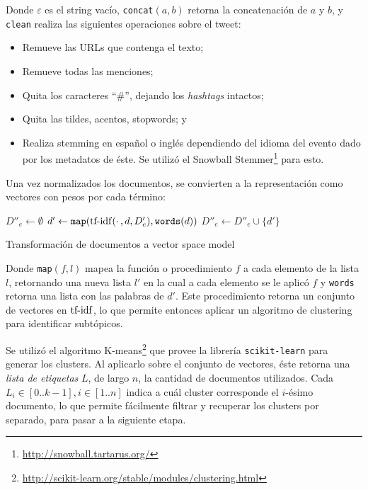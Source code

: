     Donde $\varepsilon$ es el string vacío, \texttt{concat}$(a,b)$ retorna
    la concatenación de $a$ y $b$, y \texttt{clean} realiza las siguientes
    operaciones sobre el tweet:

\begin{itemize}
\item Remueve las URLs que contenga el texto;
\item Remueve todas las menciones;
\item Quita los caracteres ``\#'', dejando los \emph{hashtags} intactos;
\item Quita las tildes, acentos, stopwords; y
\item Realiza stemming en español o inglés dependiendo del idioma del
      evento dado por los metadatos de éste. Se utilizó el Snowball
      Stemmer\footnote{\href{http://snowball.tartarus.org/}{http://snowball.tartarus.org/} } para esto.
\end{itemize}

    Una vez normalizados los documentos, se convierten a la
    representación como vectores con pesos por cada término:

\begin{algorithm}[H]
$D''_e \leftarrow \emptyset$ \;
 {
   $d' \leftarrow \texttt{map}(\operatorname{tf-idf}(\cdotp, d, D'_e), \texttt{words}(d))$\;
}
$D''_e \leftarrow D''_e \cup \{d'\}$\;
\caption{Transformación de documentos a vector space model}
\end{algorithm}

    Donde \texttt{map}$(f,l)$ mapea la
    función o procedimiento $f$ a cada elemento de la lista $l$,
    retornando una nueva lista $l'$ en la cual a cada elemento se le
    aplicó $f$ y \texttt{words} retorna una lista con las palabras de
    $d'$. Este procedimiento retorna un conjunto de vectores en
    $\operatorname{tf-idf}$, lo que permite entonces aplicar un algoritmo de
    clustering para identificar subtópicos.

    Se utilizó el algoritmo
    K-means\footnote{\href{http://scikit-learn.org/stable/modules/clustering.html}{http://scikit-learn.org/stable/modules/clustering.html} }
    que provee la librería
    \texttt{scikit-learn} para generar los clusters. Al
    aplicarlo sobre el conjunto de vectores, éste retorna una
    \emph{lista de etiquetas} $L$, de largo $n$, la cantidad de documentos
    utilizados. Cada $L_i \in [0..k-1], i \in [1..n]$ indica a cuál
    cluster corresponde el $i$-ésimo documento, lo que permite
    fácilmente filtrar y recuperar los clusters por separado, para
    pasar a la siguiente etapa.



